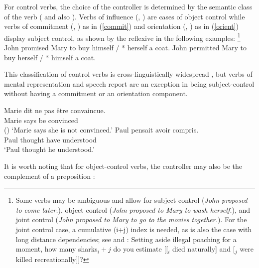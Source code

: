 For control verbs, the choice of the controller is determined by the semantic class of the verb
(\citealt[Chapter~3]{PollardandSag1994} and also \citealt{JackendoffandCulicover2003}).  Verbs of
influence (, ) are cases of object control while verbs of commitment
(, ) as in (\ref{commit}) and orientation (, ) as in
(\ref{orient}) display subject control, as shown by the reflexive in the following examples:%
\footnote{Some verbs may be ambiguous and allow for subject control (\emph{John proposed to come
    later.}), object control (\emph{John proposed to Mary to wash herself.}), and joint
  control (\emph{John proposed to Mary to go to the movies together.}). For the joint control case, a cumulative
  (i+j) index is needed, as is also the case with long distance dependencies; see
   and \crossrefchapterw[\pageref{ex:UDC:31}]{udc}:
\ea
Setting aside illegal poaching for a moment, how many sharks$_i+j$ do you estimate [[$_i$ died
naturally] and [$_j$ were killed recreationally]]?
\zlast
}
\eal
\ex\label{ex-John-promised-Mary-to-buy}
John promised Mary to buy himself / * herself a coat. \label{commit}
\ex\label{ex-John-permitted-Mary-to-buy} 
John permitted Mary to buy herself / * himself a coat.\label{orient}
\zl
 
  This classification of control verbs is cross-linguistically widespread \citep{VanValinandLapolla1997}, but  verbs of mental representation and speech report are an exception in being subject-control without having a commitment or an orientation component.


\begin{exe}
\ex \begin{xlist}
\ex 
\gll Marie dit {ne pas} \^etre convaincue.\\
     Marie says  be convinced \\\hfill()
\glt `Marie says she is not convinced.'	
\ex 
\gll Paul pensait  avoir compris. \\
     Paul thought have understood \\
\glt `Paul thought he understood.'
 \end{xlist}
\end{exe}

It is worth noting that for object-control verbs, the controller may also be the complement of a preposition \citep[]{PollardandSag1994}:

